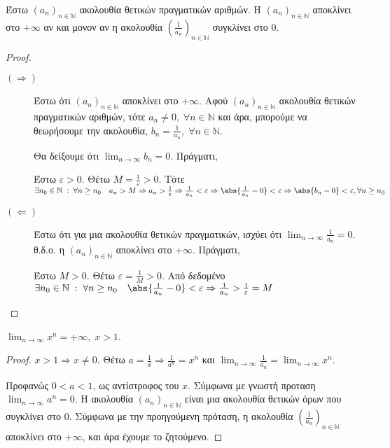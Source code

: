 \documentclass[main.tex]{subfiles}
\begin{document}
\begin{prop}
    Έστω $ (a_{n})_{n \in \mathbb{N}} $ ακολουθία θετικών 
    πραγματικών αριθμών. 
    Η $ (a_{n})_{n \in \mathbb{N}} $ αποκλίνει στο $ + \infty $ αν και 
    μονον αν η ακολουθία 
    $ \left(\frac{1}{a_{n}} \right)_{n \in \mathbb{N}} $ συγκλίνει στο 0.
\end{prop}


\begin{proof}
\item {}
    \begin{description}
        \item[$ (\Rightarrow) $] Έστω ότι $ (a_{n})_{n \in \mathbb{N}} $ 
            αποκλίνει στο $ + \infty $. Αφού $ (a_{n})_{n \in \mathbb{N}} $
            ακολουθία θετικών πραγματικών αριθμών, τότε $ a_{n} \neq 0, 
            \; \forall n \in \mathbb{N}$ και άρα, μπορούμε να θεωρήσουμε 
            την ακολουθία, $ b_{n} = \frac{1}{a_{n}}, \; \forall n \in
            \mathbb{N}  $. 

            Θα δείξουμε ότι $ \lim_{n \to \infty} b_{n} = 0 $. Πράγματι,

            Έστω $ \varepsilon >0 $. Θέτω $ M = \frac{1}{\varepsilon} >0 $.
            Τότε $ \exists n_{0} \in \mathbb{N} \; : \; \forall n \geq 
            n_{0} \quad a_{n}> M \Rightarrow a_{n} > \frac{1}{\varepsilon} 
            \Rightarrow \frac{1}{a_{n}} < \varepsilon \Rightarrow
            \abs{\frac{1}{a_{n}} - 0} < \varepsilon \Rightarrow 
            \abs{b_{n}-0} < \varepsilon, \forall n \geq n_{0} $

        \item [$ ( \Leftarrow) $]
            Έστω ότι για μια ακολουθία θετικών πραγματικών, ισχύει ότι 
            $ \lim_{n \to \infty} \frac{1}{a_{n}} = 0$. θ.δ.ο. η $ 
        (a_{n})_{n \in \mathbb{N}}$ αποκλίνει στο $ + \infty $. Πράγματι,

        Έστω $ M > 0 $. Θέτω $ \varepsilon = \frac{1}{M} > 0 $. Από 
        δεδομένο $ \exists n_{0} \in \mathbb{N} \; : \; \forall n \geq 
        n_{0} \quad \abs{\frac{1}{a_{n}} - 0} < \varepsilon \Rightarrow
        \frac{1}{a_{n}} > \frac{1}{\varepsilon}=M $
    \end{description}
\end{proof}

\begin{prop}
    $ \lim_{n \to \infty} x^{n} = +\infty, \; x >1 $.
\end{prop}

\begin{proof}
\item {}
    $ x >1 \Rightarrow x \neq 0 $. Θέτω  $a = \frac{1}{x} \Rightarrow 
    \frac{1}{a^{n}} = x^{n} $ και $ \lim_{n \to \infty} \frac{1}{a_{n}} = 
    \lim_{n \to \infty}x^{n}$.

    Προφανώς $ 0 < a <1 $, ως αντίστροφος του $x$. Σύμφωνα με γνωστή προταση
    $ \lim_{n \to \infty} a^{n} = 0 $. Η ακολουθία $ (a_{n})_{n \in \mathbb{N}}
    $ είναι μια ακολουθία θετικών όρων που συγκλίνει στο 0. Σύμφωνα με 
    την προηγούμενη πρόταση, η ακολουθία $ \left(\frac{1}{a_{n}}\right)_{n 
    \in \mathbb{N}} $ αποκλίνει στο $ + \infty $, και άρα έχουμε το ζητούμενο.
\end{proof}
\end{document}
